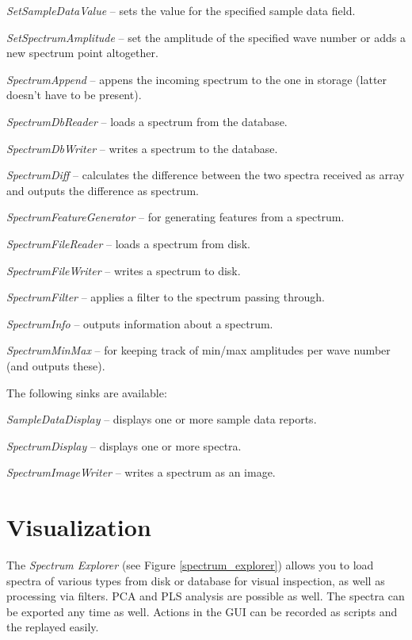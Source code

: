 \documentclass[a4paper]{book}
\begin{document}
\begin{tight_itemize}
  \item \textit{SetSampleDataValue} -- sets the value for the specified
  sample data field.
  \item \textit{SetSpectrumAmplitude} -- set the amplitude of the
  specified wave number or adds a new spectrum point altogether.
  \item \textit{SpectrumAppend} -- appens the incoming spectrum to the one
  in storage (latter doesn't have to be present).
  \item \textit{SpectrumDbReader} -- loads a spectrum from the database.
  \item \textit{SpectrumDbWriter} -- writes a spectrum to the database.
  \item \textit{SpectrumDiff} -- calculates the difference between the
  two spectra received as array and outputs the difference as spectrum.
  \item \textit{SpectrumFeatureGenerator} -- for generating features from
  a spectrum.
  \item \textit{SpectrumFileReader} -- loads a spectrum from disk.
  \item \textit{SpectrumFileWriter} -- writes a spectrum to disk.
  \item \textit{SpectrumFilter} -- applies a filter to the spectrum passing through.
  \item \textit{SpectrumInfo} -- outputs information about a spectrum.
  \item \textit{SpectrumMinMax} -- for keeping track of min/max amplitudes per
  wave number (and outputs these).
\end{tight_itemize}
The following sinks are available:
\begin{tight_itemize}
  \item \textit{SampleDataDisplay} -- displays one or more sample data reports.
  \item \textit{SpectrumDisplay} -- displays one or more spectra.
  \item \textit{SpectrumImageWriter} -- writes a spectrum as an image.
\end{tight_itemize}

\chapter{Visualization}
The \textit{Spectrum Explorer} (see Figure \ref{spectrum_explorer}) allows you
to load spectra of various types from disk or database for visual inspection,
as well as processing via filters. PCA and PLS analysis are possible as well.
The spectra can be exported any time as well.
Actions in the GUI can be recorded as scripts and the replayed easily.
\end{document}
